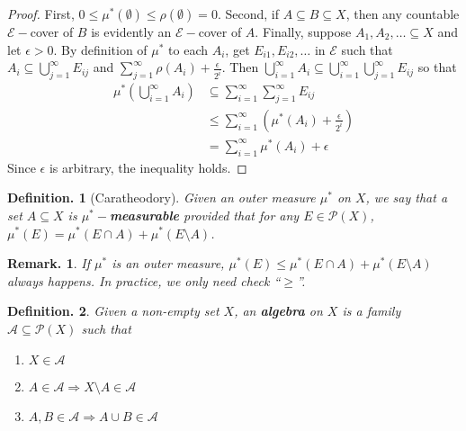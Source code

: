 \documentclass[11pt, a4paper]{memoir}
\theoremstyle{change}
\theoremstyle{plain}
\theoremstyle{nonumberplain}
\newtheorem{definition}{Definition.}
\newtheorem{remark}{Remark.}
\newtheorem{proof}{Proof}
\begin{document}
\begin{proof}
    First, $0\leq\mu^*(\emptyset)\leq\rho(\emptyset)=0$.
    Second, if $A\subseteq B\subseteq X$, then any countable $\mathcal{E}-$cover of $B$ is evidently an $\mathcal{E}-$cover of $A$.
    Finally, suppose $A_1,A_2,\ldots\subseteq X$ and let $\epsilon>0$.
    By definition of $\mu^*$ to each $A_i$, get $E_{i1},E_{i2},\ldots$ in $\mathcal{E}$ such that $A_i\subseteq\bigcup_{j=1}^\infty E_{ij}$ and $\sum_{j=1}^\infty \rho(A_i)+\frac{\epsilon}{2^i}$.
    Then $\bigcup_{i=1}^\infty A_i\subseteq\bigcup_{i=1}^\infty\bigcup_{j=1}^\infty E_{ij}$ so that
    \begin{align*}
        \mu^*\left(\bigcup\limits_{i=1}^\infty A_i\right) &\subseteq\sum\limits_{i=1}^\infty\sum\limits_{j=1}^\infty E_{ij}\\
                                                          &\leq \sum\limits_{i=1}^\infty\left(\mu^*(A_i)+\frac{\epsilon}{2^i}\right)\\
                                                          &= \sum\limits_{i=1}^\infty \mu^*(A_i)+\epsilon
    \end{align*}
    Since $\epsilon$ is arbitrary, the inequality holds.
\end{proof}
\begin{definition}[Caratheodory]
    Given an outer measure $\mu^*$ on $X$, we say that a set $A\subseteq X$ is \textbf{$\mu^*-$measurable} provided that for any $E\in\mathcal{P}(X)$, $\mu^*(E)=\mu^*(E\cap A)+\mu^*(E\setminus A)$.
\end{definition}
\begin{remark}
    If $\mu^*$ is an outer measure, $\mu^*(E)\leq\mu^*(E\cap A)+\mu^*(E\setminus A)$ always happens.
    In practice, we only need check ``$\geq$''.
\end{remark}
\begin{definition}
    Given a non-empty set $X$, an \textbf{algebra} on $X$ is a family $\mathcal{A}\subseteq\mathcal{P}(X)$ such that
    \begin{enumerate}[nolistsep,label=(\roman*)]
        \item $X\in\mathcal{A}$
        \item $A\in\mathcal{A}\Rightarrow X\setminus A\in\mathcal{A}$
        \item $A,B\in\mathcal{A}\Rightarrow A\cup B\in\mathcal{A}$
    \end{enumerate}
\end{definition}
\end{document}
